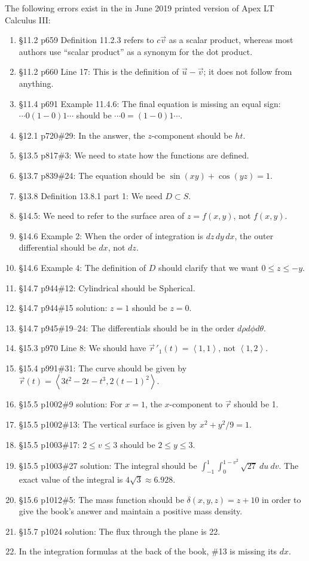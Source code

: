\documentclass{amsart}
\newcommand{\bracket}[1]{\left\langle#1\right\rangle}
\begin{document}
The following errors exist in the in June 2019 printed version of Apex LT Calculus III:
\begin{enumerate}
\item \S11.2 p659 Definition 11.2.3 refers to $c\vec v$ as a scalar product, whereas most authors use ``scalar product'' as a synonym for the dot product.
\item \S11.2 p660 Line 17: This is the definition of $\vec u-\vec v$; it does not follow from anything.
\item \S11.4 p691 Example 11.4.6: The final equation is missing an equal sign: $\dotsm0(1-0)1\dotsb$ should be $\dotsm0=(1-0)1\dotsb$.
\item \S12.1 p720\#29: In the answer, the $z$-component should be $ht$.
\item \S13.5 p817\#3: We need to state how the functions are defined.
\item \S13.7 p839\#24: The equation should be $\sin(xy)+\cos(yz)=1$.
\item \S13.8 Definition 13.8.1 part 1: We need $D\subset S$.
\item \S14.5: We need to refer to the surface area of $z=f(x,y)$, not $f(x,y)$.
\item \S14.6 Example 2: When the order of integration is $dz\,dy\,dx$, the outer differential should be $dx$, not $dz$.
\item \S14.6 Example 4: The definition of $D$ should clarify that we want $0\le z\le-y$.
\item \S14.7 p944\#12: Cylindrical should be Spherical.
\item \S14.7 p944\#15 solution: $z=1$ should be $z=0$.
\item \S14.7 p945\#19--24: The differentials should be in the order $d\rho d\phi d\theta$.
\item \S15.3 p970 Line 8: We should have $\vec r\,'_1(t)=\bracket{1,1}$, not $\bracket{1,2}$.
\item \S15.4 p991\#31: The curve should be given by $\vec r(t)=\bracket{3t^2-2t-t^3,2(t-1)^2}$.
\item \S15.5 p1002\#9 solution: For $x=1$, the $x$-component to $\vec r$ should be 1.
\item \S15.5 p1002\#13: The vertical surface is given by $x^2+y^2/9=1$.
\item \S15.5 p1003\#17: $2\le v\le3$ should be $2\le y\le3$.
\item \S15.5 p1003\#27 solution: The integral should be $\int_{-1}^1\int_0^{1-v^2}\sqrt{27}\ du\ dv$. The exact value of the integral is $4\sqrt3\approx6.928$.
\item \S15.6 p1012\#5: The mass function should be $\delta(x,y,z)=z+10$ in order to give the book's answer and maintain a positive mass density.
\item \S15.7 p1024 solution: The flux through the plane is 22.
\item In the integration formulas at the back of the book, \#13 is missing its $dx$.
\label{2019-06III}
\end{enumerate}
\end{document}
